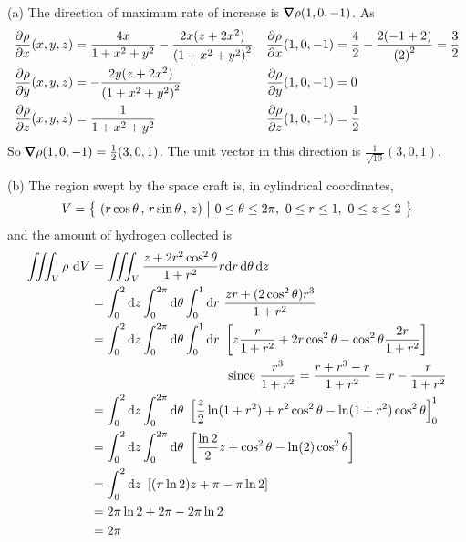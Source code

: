 \begin{solution}
(a) The direction of maximum rate of increase is $\vnabla\rho(1,0,-1)$.
As
\begin{align*}
\pdiff{\rho}{x}(x,y,z)
      &= \frac{4x}{1+x^2+y^2} -\frac{2x(z+2x^2)}{{(1+x^2+y^2)}^2} &
\pdiff{\rho}{x}(1,0,-1)
      &= \frac{4}{2} -\frac{2(-1+2)}{{(2)}^2} =\frac{3}{2}
\\
\pdiff{\rho}{y}(x,y,z)
      &=  -\frac{2y(z+2x^2)}{{(1+x^2+y^2)}^2} &
\pdiff{\rho}{y}(1,0,-1)
      &=  0\\
\pdiff{\rho}{z}(x,y,z)
      &= \frac{1}{1+x^2+y^2} &
\pdiff{\rho}{z}(1,0,-1)
      &= \frac{1}{2}  
\end{align*}
So $\vnabla\rho(1,0,-1) = \frac{1}{2}(3,0,1)$. The unit vector
in this direction is $\frac{1}{\sqrt{10}}(3,0,1)$.

(b) The region swept by the space craft is, in cylindrical coordinates,
\begin{equation*}
   V=\Set{(r\cos\theta\,,\,r\sin\theta\,,\,z)}{0\le\theta\le 2\pi,\ 
             0\le r\le 1,\ 
              0\le z\le 2}
\end{equation*}
and the amount of hydrogen collected is
\begin{align*}
\tripInt_V \rho\ \dee{V} &=\tripInt_V\frac{z+2r^2\cos^2\theta}{1+r^2}r\dee{r}\,\dee{\theta}\,\dee{z} \\
&=\int_0^2\dee{z} \int_0^{2\pi} \dee{\theta} \int_0^1\dee{r}\ 
              \frac{zr+(2\cos^2\theta)r^3}{1+r^2} \\
&=\int_0^2\dee{z} \int_0^{2\pi} \dee{\theta} \int_0^1\dee{r}\ 
     \left[ z \frac{r}{1+r^2} +2r\cos^2\theta 
               -\cos^2\theta\frac{2r}{1+r^2}\right]\\
&\hskip1.5in\text{since }\frac{r^3}{1+r^2} = \frac{r+r^3 - r}{1+r^2}
                         =r-\frac{r}{1+r^2} \\
&=\int_0^2\dee{z} \int_0^{2\pi} \dee{\theta}\ 
              \left[\frac{z}{2}\ln(1+r^2)+r^2\cos^2\theta
                     -\ln(1+r^2)\cos^2\theta\right]_0^1 \\
&=\int_0^2\dee{z} \int_0^{2\pi} \dee{\theta}\ 
              \left[\frac{\ln 2}{2} z+ \cos^2\theta
                     -\ln(2)\cos^2\theta\right] \\
&=\int_0^2\dee{z} \ \left[(\pi\ln 2) z+ \pi-\pi\ln 2\right] \\
&= 2\pi\ln 2 +2\pi -2\pi\ln 2 \\
&=2\pi
\end{align*}
\end{solution}

